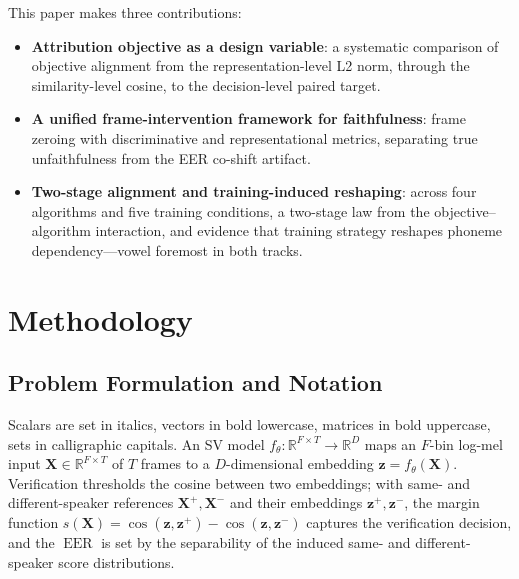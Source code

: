 \documentclass{article}
\DeclareMathOperator{\EER}{EER}
\begin{document}
This paper makes three contributions:
\begin{itemize}
  \item \textbf{Attribution objective as a design variable}: a systematic comparison of objective alignment from the representation-level L2 norm, through the similarity-level cosine, to the decision-level paired target.
  \item \textbf{A unified frame-intervention framework for faithfulness}: frame zeroing with discriminative and representational metrics, separating true unfaithfulness from the EER co-shift artifact.
  \item \textbf{Two-stage alignment and training-induced reshaping}: across four algorithms and five training conditions, a two-stage law from the objective--algorithm interaction, and evidence that training strategy reshapes phoneme dependency---vowel foremost in both tracks.
\end{itemize}

\section{Methodology}
\label{sec:framework}

\subsection{Problem Formulation and Notation}

Scalars are set in italics, vectors in bold lowercase, matrices in bold uppercase, sets in calligraphic capitals. An SV model $f_{\theta}:\mathbb{R}^{F\times T}\to\mathbb{R}^{D}$ maps an $F$-bin log-mel input $\mathbf{X}\in\mathbb{R}^{F\times T}$ of $T$ frames to a $D$-dimensional embedding $\mathbf{z}=f_{\theta}(\mathbf{X})$. Verification thresholds the cosine between two embeddings; with same- and different-speaker references $\mathbf{X}^{+},\mathbf{X}^{-}$ and their embeddings $\mathbf{z}^{+},\mathbf{z}^{-}$, the margin function $s(\mathbf{X})=\cos(\mathbf{z},\mathbf{z}^{+})-\cos(\mathbf{z},\mathbf{z}^{-})$ captures the verification decision, and the $\EER$ is set by the separability of the induced same- and different-speaker score distributions.
\end{document}
